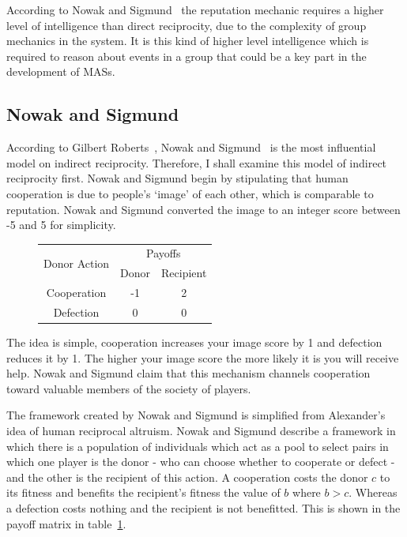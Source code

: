 \documentclass[]{final_report}
\begin{document}
According to Nowak and Sigmund~\cite{evol_indirect_image} the reputation mechanic requires a higher level of intelligence than direct reciprocity, due to the complexity of group mechanics in the system. It is this kind of higher level intelligence which is required to reason about events in a group that could be a key part in the development of MASs.

\subsection{Nowak and Sigmund}
\label{sec:nowak_sig}
According to Gilbert Roberts~\cite{evoldirindir}, Nowak and Sigmund~\cite{evol_indirect_image} is the most influential model on indirect reciprocity. Therefore, I shall examine this model of indirect reciprocity first. Nowak and Sigmund begin by stipulating that human cooperation is due to people's `image' of each other, which is comparable to reputation. Nowak and Sigmund converted the image to an integer score between -5 and 5 for simplicity.\par
\begin{figure}
\vspace{-20pt}
\begin{framed}
	\begin{center}
		\begin{tabular}{c|c|c}
		\multirow{2}{*}{Donor Action} & \multicolumn{2}{c}{Payoffs}\\	
		& Donor & Recipient\\
		\hline
		Cooperation & -1 & 2\\
		\hline
		Defection & 0 & 0\\
		\end{tabular}
		\label{tab:indirrec_payoffmatrix}
	\end{center}	
\end{framed}
\vspace{-20pt}
\end{figure}
The idea is simple, cooperation increases your image score by 1 and defection reduces it by 1. The higher your image score the more likely it is you will receive help. Nowak and Sigmund claim that this mechanism channels cooperation toward valuable members of the society of players.\par
The framework created by Nowak and Sigmund is simplified from Alexander's~\cite{alexander1987biology} idea of human reciprocal altruism. Nowak and Sigmund describe a framework in which there is a population of individuals which act as a pool to select pairs in which one player is the donor - who can choose whether to cooperate or defect - and the other is the recipient of this action. A cooperation costs the donor $c$ to its fitness and benefits the recipient's fitness the value of $b$ where $b>c$. Whereas a defection costs nothing and the recipient is not benefitted. This is shown in the payoff matrix in table~\ref{tab:indirrec_payoffmatrix}.\par
\end{document}
